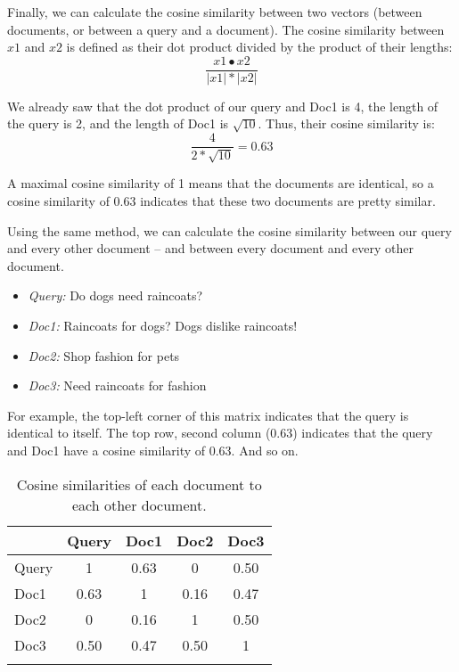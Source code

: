 Finally, we can calculate the cosine similarity between two vectors (between documents, or between a query and a document).  The cosine similarity between $x1$ and $x2$ is defined as their dot product divided by the product of their lengths:
\begin{equation}
 \frac{x1 \bullet x2}{|x1| * |x2|}
\end{equation}


We already saw that the dot product of our query and Doc1 is 4, the length of the query is 2, and the length of Doc1 is $\sqrt{10}$.  Thus, their cosine similarity is:
\begin{equation}
 \frac{4}{2 * \sqrt{10}} = 0.63
\end{equation}


A maximal cosine similarity of 1 means that the documents are identical, so a cosine similarity of 0.63 indicates that these two documents are pretty similar.

Using the same method, we can calculate the cosine similarity between our query and every other document -- and between every document and every other document.

\begin{itemize}
\item \emph{Query:} Do dogs need raincoats?
\item \emph{Doc1:} Raincoats for dogs?  Dogs dislike raincoats!
\item \emph{Doc2:} Shop fashion for pets
\item \emph{Doc3:} Need raincoats for fashion
\end{itemize}

For example, the top-left corner of this matrix indicates that the query is identical to itself.  The top row, second column (0.63) indicates that the query and Doc1 have a cosine similarity of 0.63.  And so on. 

\begin{table}
\begin{tabular}{l c c c c } %
\lsptoprule
  & Query & Doc1 & Doc2 & Doc3  \\ \midrule
Query & 1 & 0.63 & 0 & 0.50 \\
Doc1 & 0.63 & 1 & 0.16 & 0.47 \\
Doc2 & 0 & 0.16 & 1 & 0.50 \\
Doc3 & 0.50 & 0.47 & 0.50 & 1 \\
\lspbottomrule
\end{tabular}
\caption{Cosine similarities of each document to each other document.}
\end{table}

